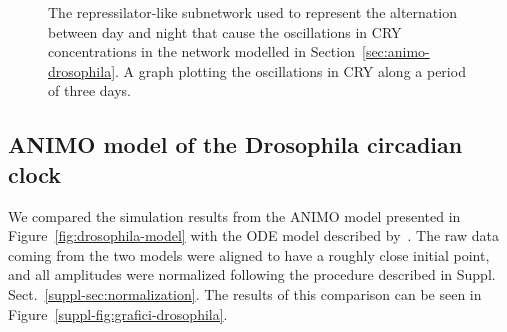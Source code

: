 \begin{figure}[!htb]
\begin{minipage}{\textwidth}
  \centering
  \qquad
\caption{{\bf \protect{}} The repressilator-like subnetwork used to represent the alternation
between day and night that cause the oscillations in {\sf CRY} concentrations in the
network modelled in Section~\ref{sec:animo-drosophila}.
{\bf \protect{}} A graph plotting the oscillations in {\sf CRY} along
a period of three days.}\label{fig:repressilator}
\end{minipage}
\end{figure}


\subsection{ANIMO model of the Drosophila circadian clock}\label{suppl-sec:animo-drosophila}
We compared the simulation results from the ANIMO model presented in Figure~\ref{fig:drosophila-model}
with the ODE model described by~\citet{drosophila-ode-model}. The raw data coming from the
two models were aligned to have a roughly close initial point, and all amplitudes were normalized
following the procedure described in Suppl. Sect.~\ref{suppl-sec:normalization}. The results
of this comparison can be seen in Figure~\ref{suppl-fig:grafici-drosophila}.

